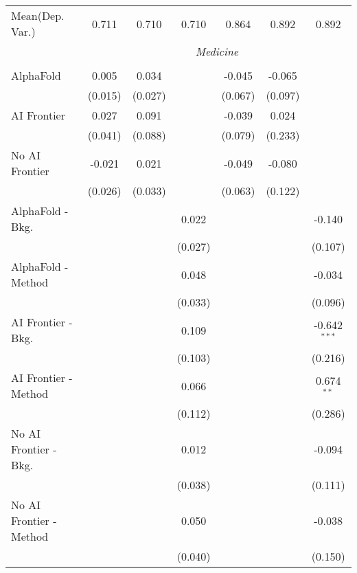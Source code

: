 \begin{tabular}{lcccccc}
Mean(Dep. Var.) & 0.711 & 0.710 & 0.710 & 0.864 & 0.892 & 0.892 \\
 & \multicolumn{6}{c}{\textit{Medicine}} \\ \\
   AlphaFold               & 0.005   & 0.034   &         & -0.045  & -0.065  &   \\   
                           & (0.015) & (0.027) &         & (0.067) & (0.097) &   \\   
   AI Frontier             & 0.027   & 0.091   &         & -0.039  & 0.024   &   \\   
                           & (0.041) & (0.088) &         & (0.079) & (0.233) &   \\   
   No AI Frontier          & -0.021  & 0.021   &         & -0.049  & -0.080  &   \\   
                           & (0.026) & (0.033) &         & (0.063) & (0.122) &   \\   
   AlphaFold - Bkg.        &         &         & 0.022   &         &         & -0.140\\   
                           &         &         & (0.027) &         &         & (0.107)\\   
   AlphaFold - Method      &         &         & 0.048   &         &         & -0.034\\   
                           &         &         & (0.033) &         &         & (0.096)\\   
   AI Frontier - Bkg.      &         &         & 0.109   &         &         & -0.642$^{***}$\\   
                           &         &         & (0.103) &         &         & (0.216)\\   
   AI Frontier - Method    &         &         & 0.066   &         &         & 0.674$^{**}$\\   
                           &         &         & (0.112) &         &         & (0.286)\\   
   No AI Frontier - Bkg.   &         &         & 0.012   &         &         & -0.094\\   
                           &         &         & (0.038) &         &         & (0.111)\\   
   No AI Frontier - Method &         &         & 0.050   &         &         & -0.038\\   
                           &         &         & (0.040) &         &         & (0.150)\\   
   \midrule

\end{tabular}
